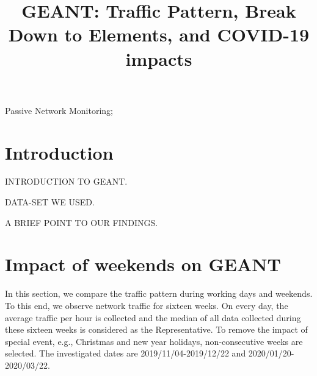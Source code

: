 \documentclass[10pt, journal, letterpaper]{IEEEtran}
\begin{document}
\title{GEANT: Traffic Pattern, Break Down to Elements, and COVID-19 impacts}
\author{}
\maketitle	
\begin{abstract}
\end{abstract}	
\begin{IEEEkeywords} 
    Passive Network Monitoring;
\end{IEEEkeywords}

\section{Introduction}
INTRODUCTION TO GEANT.

DATA-SET WE USED.

A BRIEF POINT TO OUR FINDINGS.

\section{Impact of weekends on GEANT}
In this section, we compare the traffic pattern during working days and weekends. To this end, we observe network traffic for sixteen weeks. On every day, the average traffic per hour is collected and the median of all data collected during these sixteen weeks is considered as the Representative. To remove the impact of special event, e.g., Christmas and new year holidays, non-consecutive weeks are selected. The investigated dates are 2019/11/04-2019/12/22 and 2020/01/20-2020/03/22.
\end{document}
